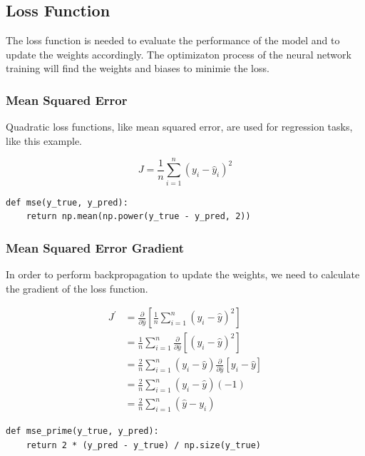 \documentclass[openany]{book}
\begin{document}
    \subsection{Loss Function}\label{loss-function}

The loss function is needed to evaluate the performance of the model and
to update the weights accordingly. The optimizaton process of the neural
network training will find the weights and biases to minimie the loss.

    \subsubsection{Mean Squared Error}\label{mean-squared-error}

Quadratic loss functions, like mean squared error, are used for
regression tasks, like this example.

\[
J = \frac{1}{n} \sum_{i=1}^{n} (y_i - \hat{y}_i)^2
\]

\begin{tcolorbox}
\tiny
\begin{verbatim}
def mse(y_true, y_pred):
    return np.mean(np.power(y_true - y_pred, 2))
\end{verbatim}
\end{tcolorbox}

    \subsubsection{Mean Squared Error
Gradient}\label{mean-squared-error-gradient}

In order to perform backpropagation to update the weights, we need to
calculate the gradient of the loss function.

\begin{align*}
J^{\prime} &= \frac{\partial}{\partial \hat{y}} [ \frac{1}{n} \sum_{i=1}^{n}(y_{i}-\hat{y})^2 ] \\
&= \frac{1}{n} \sum_{i=1}^{n}\frac{\partial}{\partial \hat{y}} [ (y_{i}-\hat{y})^2 ] \\
&= \frac{2}{n} \sum_{i=1}^{n} (y_{i}-\hat{y}) \frac{\partial}{\partial \hat{y}}[y_{i}-\hat{y}] \\
&= \frac{2}{n} \sum_{i=1}^{n} (y_{i}-\hat{y}) (-1) \\
&= \frac{2}{n} \sum_{i=1}^{n}(\hat{y}-y_{i})
\end{align*}

\begin{tcolorbox}
\tiny
\begin{verbatim}
def mse_prime(y_true, y_pred):
    return 2 * (y_pred - y_true) / np.size(y_true)
\end{verbatim}
\end{tcolorbox}
\end{document}

